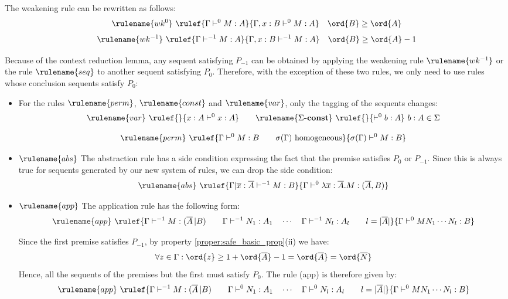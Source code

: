 The weakening rule can be rewritten as follows:
$$ \rulename{wk^{0}} \   \rulef{\Gamma \vdash^{0} M : A}{\Gamma , x : B \vdash^{0} M : A} \quad \ord{B} \geq \ord{A} $$
$$ \rulename{wk^{-1}} \   \rulef{\Gamma \vdash^{-1} M : A}{\Gamma , x : B \vdash^{-1} M : A} \quad \ord{B} \geq \ord{A} -1$$

Because of the context reduction lemma, any sequent satisfying $P_{-1}$ can be obtained
by applying the weakening rule $\rulename{wk^{-1}}$ or the rule $\rulename{seq}$ to another sequent
satisfying $P_0$. Therefore, with the exception of these two rules, we only need to use rules whose conclusion sequents satisfy $P_0$:
\begin{itemize}
\item For the rules $\rulename{perm}$, $\rulename{const}$ and $\rulename{var}$, only the tagging of the sequents
changes:
$$ \rulename{var} \   \rulef{}{x : A\vdash^{0} x : A}
\qquad
\rulename{\Sigma\mbox{\textbf{-const}}}  \  \rulef{}{\vdash^0 b : A} \ b:A \in \Sigma
$$

$$
  \rulename{perm} \  \rulef{
      { \Gamma \vdash^0 M:B \qquad \sigma(\Gamma)  } \hbox{ homogeneous}
    }
      { \sigma(\Gamma) \vdash^0 M : B }
$$

\item $\rulename{abs}$ The abstraction rule has a side condition
expressing the fact that the premise satisfies $P_0$ or $P_{-1}$. Since this is always true for sequents
generated by our new system of rules, we can drop the side condition:
$$ \rulename{abs} \   \rulef{\Gamma | \overline{x} : \overline{A} \vdash^{-1} M : B}
                                   {\Gamma  \vdash^{0} \lambda \overline{x} : \overline{A} . M : (\overline{A},B)}$$


\item $\rulename{app}$ The application rule has the following form:
$$ \rulename{app} \
    \rulef{
        { \Gamma \vdash^{-1} M : (\overline{A} \, | B)
        \qquad
        \Gamma \vdash^{-1} N_1 : A_1 \quad \cdots \quad \Gamma \vdash^{-1} N_{l} : A_l \qquad l = |\overline{A}|
        }
    }
    {
        \Gamma \vdash^0 M N_1 \cdots N_{l} : B
    }
$$

Since the first premise satisfies $P_{-1}$, by property \ref{proper:safe_basic_prop}(ii) we have:
$$\forall z \in \Gamma : \ord{z} \geq 1 + \ord{\overline{A}} -1 = \ord{\overline{A}} = \ord{\overline{N}}$$
Hence, all the sequents of the premises but the first must satisfy $P_0$. The rule (app) is therefore given by:
$$ \rulename{app} \
    \rulef{
        { \Gamma \vdash^{-1} M : (\overline{A} \, | B)
        \qquad
        \Gamma \vdash^0 N_1 : A_1 \quad \cdots \quad \Gamma \vdash^0 N_{l} : A_l \qquad l = |\overline{A}|
        }
    }{
        \Gamma \vdash^0 M N_1 \cdots N_{l} : B
      }
$$


\end{itemize}
